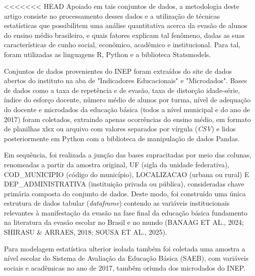 \documentclass[english, spanish, brazilian]{RBIEarticle} %
\begin{document}
<<<<<<< HEAD
Apoiado em tais conjuntos de dados, a metodologia deste artigo consiste no processamento desses dados e a utilização de técnicas estatísticas que possibilitem uma análise quantitativa acerca da evasão de alunos do ensino médio brasileiro, e quais fatores explicam tal fenômeno, dadas as suas características de cunho social, econômico, acadêmico e institucional. Para tal, foram utilizadas as linguagens R, Python e a biblioteca Statsmodels.  

Conjuntos de dados provenientes do INEP foram extraídos do site de dados abertos do instituto na aba de "Indicadores Educacionais" e "Microdados". Bases de dados como a taxa de repetência e de evasão, taxa de distorção idade-série, índice do esforço docente, número médio de alunos por turma, nível de adequação do docente e microdados da educação básica (todos a nível municipal e do ano de 2017) foram coletados, extraindo apenas ocorrências do ensino médio, em formato de planilhas xlsx ou arquivo com valores separados por vírgula (\textit{CSV}) e lidos posteriormente em Python com a biblioteca de manipulação de dados Pandas.

Em sequência, foi realizada a junção das bases supracitadas por meio das colunas, renomeadas a partir da amostra original, UF (sigla da unidade federativa), COD\_MUNICIPIO (código do município), LOCALIZACAO (urbana ou rural) E DEP\_ADMINISTRATIVA (instituição privada ou pública), consideradas chave primária composta do conjunto de dados. Deste modo, foi construído uma única estrutura de dados tabular (\textit{dataframe}) contendo as variáveis institucionais relevantes à manifestação da evasão na fase final da educação básica fundamento na literatura da evasão escolar no Brasil e no mundo (BANAAG ET AL., 2024; SHIRASU \& ARRAES, 2018; SOUSA ET AL., 2025). 

Para modelagem estatística ulterior isolada também foi coletada uma amostra a nível escolar do Sistema de Avaliação da Educação Básica (SAEB), com variáveis sociais e acadêmicas no ano de 2017, também oriunda dos microdados do INEP.
\end{document}
